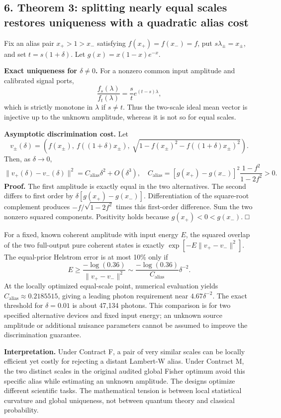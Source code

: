 \documentclass[
  10pt,
  a4paper,
]{article}
\begin{document}
\subsection{6. Theorem 3: splitting nearly equal scales restores uniqueness with a quadratic alias cost}\label{theorem-3-splitting-nearly-equal-scales-restores-uniqueness-with-a-quadratic-alias-cost}

Fix an alias pair \(x_+>1>x_-\) satisfying \(f(x_+)=f(x_-)=f\), put \(s\lambda_\pm=x_\pm\), and set \(t=s(1+\delta)\). Let \(g(x)=x(1-x)e^{-x}\).

\textbf{Exact uniqueness for \(\delta\ne0\).} For a nonzero common input amplitude and calibrated signal ports, \[
 \frac{f_s(\lambda)}{f_t(\lambda)}=\frac st e^{(t-s)\lambda},
\] which is strictly monotone in \(\lambda\) if \(s\ne t\). Thus the two-scale ideal mean vector is injective up to the unknown amplitude, whereas it is not so for equal scales.

\textbf{Asymptotic discrimination cost.} Let \[
 v_\pm(\delta)=\left(f(x_\pm),\ f((1+\delta)x_\pm),\ \sqrt{1-f(x_\pm)^2-f((1+\delta)x_\pm)^2}\right).
\] Then, as \(\delta\to0\), \[
 \boxed{\|v_+(\delta)-v_-(\delta)\|^2
 =C_{\mathrm{alias}}\delta^2+O(\delta^3),\quad
 C_{\mathrm{alias}}=[g(x_+)-g(x_-)]^2\frac{1-f^2}{1-2f^2}>0.}
\] \textbf{Proof.} The first amplitude is exactly equal in the two alternatives. The second differs to first order by \(\delta[g(x_+)-g(x_-)]\). Differentiation of the square-root complement produces \(-f/\sqrt{1-2f^2}\) times this first-order difference. Sum the two nonzero squared components. Positivity holds because \(g(x_+)<0<g(x_-)\). □

For a fixed, known coherent amplitude with input energy \(E\), the squared overlap of the two full-output pure coherent states is exactly \(\exp[-E\|v_+-v_-\|^2]\). The equal-prior Helstrom error is at most 10\% only if \[
 E\ge\frac{-\log(0.36)}{\|v_+-v_-\|^2}
 \sim \frac{-\log(0.36)}{C_{\mathrm{alias}}}\delta^{-2}.
\] At the locally optimized equal-scale point, numerical evaluation yields \(C_{\mathrm{alias}}\approx0.2185515\), giving a leading photon requirement near \(4.67\delta^{-2}\). The exact threshold for \(\delta=0.01\) is about 47,134 photons. This comparison is for two specified alternative devices and fixed input energy; an unknown source amplitude or additional nuisance parameters cannot be assumed to improve the discrimination guarantee.

\textbf{Interpretation.} Under Contract F, a pair of very similar scales can be locally efficient yet costly for rejecting a distant Lambert-W alias. Under Contract M, the two distinct scales in the original audited global Fisher optimum avoid this specific alias while estimating an unknown amplitude. The designs optimize different scientific tasks. The mathematical tension is between local statistical curvature and global uniqueness, not between quantum theory and classical probability.
\end{document}
